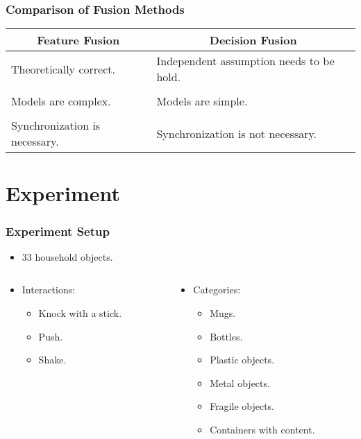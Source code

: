 \documentclass{beamer}
\begin{document}
  \begin{frame}
    \frametitle{Comparison of Fusion Methods}

    \centering
    \begin{tabular}{p{}|p{}}
      \hline
      \multicolumn{1}{c|}{\bfseries Feature Fusion} & \multicolumn{1}{c}{\bfseries Decision Fusion} \\ \hline
      Theoretically correct. & Independent assumption needs to be hold. \\
      \\
      Models are complex. & Models are simple. \\
      \\
      Synchronization is \mbox{necessary}. & Synchronization is not necessary. \\ \hline
    \end{tabular}

  \end{frame}

  \section{Experiment}
  \begin{frame}
    \frametitle{Experiment Setup}

    \begin{itemize}
      \item 33 household objects.
    \end{itemize}

    \begin{columns}
      \begin{column}{.45\textwidth}
        \begin{itemize}
          \item Interactions:
            \begin{itemize}
              \item Knock with a stick.
              \item Push.
              \item Shake.
            \end{itemize}
        \end{itemize}
      \end{column}
      \begin{column}{.45\textwidth}
        \begin{itemize}
          \item Categories:
            \begin{itemize}
              \item Mugs.
              \item Bottles.
              \item Plastic objects.
              \item Metal objects.
              \item Fragile objects.
              \item Containers with content.
            \end{itemize}
        \end{itemize}
      \end{column}
    \end{columns}
  \end{frame}
\end{document}
